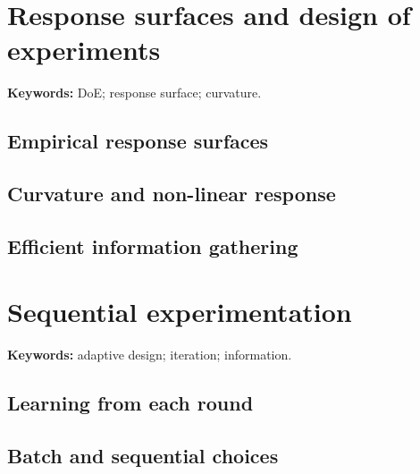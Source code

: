 
\section{Response surfaces and design of experiments}

\begin{methodbox}
\textbf{Keywords:} DoE; response surface; curvature.
\end{methodbox}

\subsection{Empirical response surfaces}


\subsection{Curvature and non-linear response}


\subsection{Efficient information gathering}


\section{Sequential experimentation}

\begin{insightbox}
\textbf{Keywords:} adaptive design; iteration; information.
\end{insightbox}

\subsection{Learning from each round}


\subsection{Batch and sequential choices}

